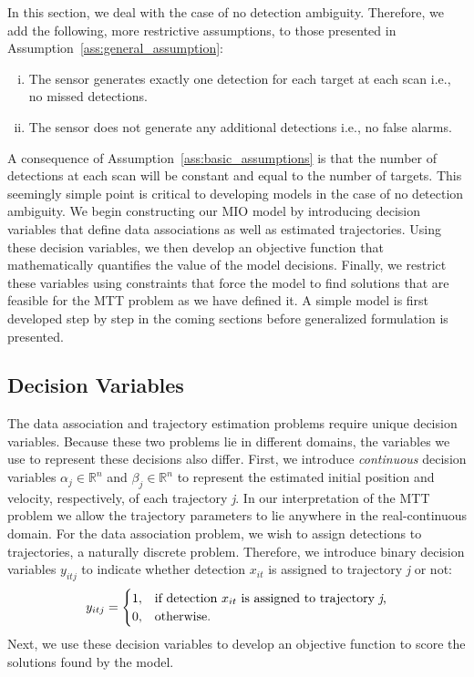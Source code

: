 In this section, we deal with the case of no detection ambiguity. Therefore, we add the following, more restrictive assumptions, to those presented in Assumption~\ref{ass:general_assumption}:

\begin{assumption}\label{ass:basic_assumptions}
\leavevmode
\begin{enumerate}[(i)]
\item The sensor generates exactly one detection for each target
 at each scan i.e., no missed detections.
\item The sensor does not generate any additional detections
i.e., no false alarms.
\end{enumerate}
\end{assumption}
A consequence of Assumption~\ref{ass:basic_assumptions} is that the number of detections at each scan will be constant and equal to the number of targets. This seemingly simple point is critical to developing models in the case of no detection ambiguity. We begin constructing our MIO model by introducing decision variables that define data associations as well as estimated trajectories. Using these decision variables, we then develop an objective function that  mathematically quantifies the value of the model decisions. Finally, we restrict these variables using constraints that force the model to find solutions that are feasible for the MTT problem as we have defined it. A simple model is first developed step by step in the coming sections before generalized formulation is presented. 

\subsection{Decision Variables}
The data association and trajectory estimation problems require unique decision variables. Because these two problems lie in different domains, the variables we use to represent these decisions also differ. First, we introduce \textit{continuous} decision variables $\alpha_{j} \in \mathbb{R}^n$ and $\beta_{j} \in \mathbb{R}^n$ to represent the estimated initial position and velocity, respectively, of each trajectory \textit{j}. In our interpretation of the MTT problem we allow the trajectory parameters to lie anywhere in the real-continuous domain. For the data association problem, we wish to assign detections to trajectories, a naturally discrete problem. Therefore, we introduce binary decision variables $y_{itj}$ to indicate whether detection $x_{it}$ is assigned to trajectory \textit{j} or not:
\[y_{itj} =
\begin{cases}
1, & \text{if detection $x_{it}$ is assigned to trajectory \textit{j},} \\
0, & \text{otherwise.}
\end{cases}\]
Next, we use these decision variables to develop an objective function to score the solutions found by the model. 


